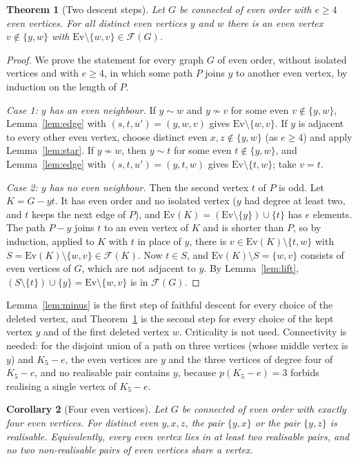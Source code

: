 \documentclass[11pt]{amsart}
\newtheorem{theorem}{Theorem}
\newtheorem{corollary}[theorem]{Corollary}
\theoremstyle{definition}
\newcommand{\cF}{\mathcal F}
\newcommand{\Ev}{\mathrm{Ev}}
\begin{document}
\begin{theorem}[Two descent steps]\label{thm:two}
Let $G$ be connected of even order with $e\ge4$ even vertices. For all distinct even vertices $y$
and $w$ there is an even vertex $v\notin\{y,w\}$ with $\Ev\setminus\{w,v\}\in\cF(G)$.
\end{theorem}

\begin{proof}
We prove the statement for every graph $G$ of even order, without isolated vertices and with
$e\ge4$, in which some path $P$ joins $y$ to another even vertex, by induction on the length of $P$.

\emph{Case 1: $y$ has an even neighbour.} If $y\sim w$ and $y\not\sim v$ for some even
$v\notin\{y,w\}$, Lemma~\ref{lem:edge} with $(s,t,u')=(y,w,v)$ gives $\Ev\setminus\{w,v\}$. If $y$
is adjacent to every other even vertex, choose distinct even $x,z\notin\{y,w\}$ (as $e\ge4$) and
apply Lemma~\ref{lem:star}. If $y\not\sim w$, then $y\sim t$ for some even $t\notin\{y,w\}$, and
Lemma~\ref{lem:edge} with $(s,t,u')=(y,t,w)$ gives $\Ev\setminus\{t,w\}$; take $v=t$.

\emph{Case 2: $y$ has no even neighbour.} Then the second vertex $t$ of $P$ is odd. Let $K=G-yt$.
It has even order and no isolated vertex ($y$ had degree at least two, and $t$ keeps the next edge
of $P$), and $\Ev(K)=(\Ev\setminus\{y\})\cup\{t\}$ has $e$ elements. The path $P-y$ joins $t$ to an
even vertex of $K$ and is shorter than $P$, so by induction, applied to $K$ with $t$ in place of $y$,
there is $v\in\Ev(K)\setminus\{t,w\}$ with $S=\Ev(K)\setminus\{w,v\}\in\cF(K)$. Now $t\in S$, and
$\Ev(K)\setminus S=\{w,v\}$ consists of even vertices of $G$, which are not adjacent to $y$. By
Lemma~\ref{lem:lift}, $(S\setminus\{t\})\cup\{y\}=\Ev\setminus\{w,v\}$ is in $\cF(G)$.
\end{proof}

Lemma~\ref{lem:minus} is the first step of faithful descent for every choice of the deleted vertex,
and Theorem~\ref{thm:two} is the second step for every choice of the kept vertex $y$ and of the
first deleted vertex $w$. Criticality is not used. Connectivity is needed: for the disjoint union
of a path on three vertices (whose middle vertex is $y$) and $K_5-e$, the even vertices are $y$ and
the three vertices of degree four of $K_5-e$, and no realisable pair contains $y$, because
$p(K_5-e)=3$ forbids realising a single vertex of $K_5-e$.

\begin{corollary}[Four even vertices]\label{cor:four}
Let $G$ be connected of even order with exactly four even vertices. For distinct even $y,x,z$, the
pair $\{y,x\}$ or the pair $\{y,z\}$ is realisable. Equivalently, every even vertex lies in at least
two realisable pairs, and no two non-realisable pairs of even vertices share a vertex.
\end{corollary}
\end{document}
